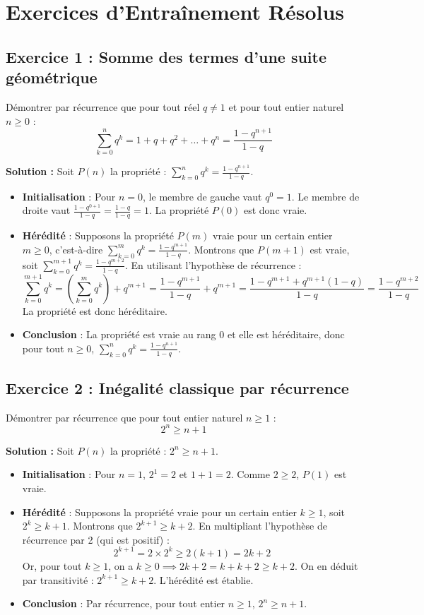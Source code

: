 \section{Exercices d'Entraînement Résolus}

\subsection*{Exercice 1 : Somme des termes d'une suite géométrique}
Démontrer par récurrence que pour tout réel $q \ne 1$ et pour tout entier naturel $n \ge 0$ :
\[
\sum_{k=0}^n q^k = 1 + q + q^2 + \dots + q^n = \frac{1-q^{n+1}}{1-q}
\]

\textbf{Solution :}
Soit $P(n)$ la propriété : $\sum_{k=0}^n q^k = \frac{1-q^{n+1}}{1-q}$.
\begin{itemize}
    \item \textbf{Initialisation} : Pour $n = 0$, le membre de gauche vaut $q^0 = 1$. Le membre de droite vaut $\frac{1-q^{0+1}}{1-q} = \frac{1-q}{1-q} = 1$. La propriété $P(0)$ est donc vraie.
    \item \textbf{Hérédité} : Supposons la propriété $P(m)$ vraie pour un certain entier $m \ge 0$, c'est-à-dire $\sum_{k=0}^m q^k = \frac{1-q^{m+1}}{1-q}$.
    Montrons que $P(m+1)$ est vraie, soit $\sum_{k=0}^{m+1} q^k = \frac{1-q^{m+2}}{1-q}$.
    En utilisant l'hypothèse de récurrence :
    \[
    \sum_{k=0}^{m+1} q^k = \left( \sum_{k=0}^m q^k \right) + q^{m+1} = \frac{1-q^{m+1}}{1-q} + q^{m+1} = \frac{1-q^{m+1} + q^{m+1}(1-q)}{1-q} = \frac{1-q^{m+2}}{1-q}
    \]
    La propriété est donc héréditaire.
    \item \textbf{Conclusion} : La propriété est vraie au rang 0 et elle est héréditaire, donc pour tout $n \ge 0$, $\sum_{k=0}^n q^k = \frac{1-q^{n+1}}{1-q}$.
\end{itemize}

\subsection*{Exercice 2 : Inégalité classique par récurrence}
Démontrer par récurrence que pour tout entier naturel $n \ge 1$ :
\[
2^n \ge n + 1
\]

\textbf{Solution :}
Soit $P(n)$ la propriété : $2^n \ge n + 1$.
\begin{itemize}
    \item \textbf{Initialisation} : Pour $n = 1$, $2^1 = 2$ et $1 + 1 = 2$. Comme $2 \ge 2$, $P(1)$ est vraie.
    \item \textbf{Hérédité} : Supposons la propriété vraie pour un certain entier $k \ge 1$, soit $2^k \ge k+1$.
    Montrons que $2^{k+1} \ge k+2$.
    En multipliant l'hypothèse de récurrence par 2 (qui est positif) :
    \[
    2^{k+1} = 2 \times 2^k \ge 2(k+1) = 2k + 2
    \]
    Or, pour tout $k \ge 1$, on a $k \ge 0 \implies 2k + 2 = k + k + 2 \ge k + 2$.
    On en déduit par transitivité : $2^{k+1} \ge k+2$. L'hérédité est établie.
    \item \textbf{Conclusion} : Par récurrence, pour tout entier $n \ge 1$, $2^n \ge n+1$.
\end{itemize}

